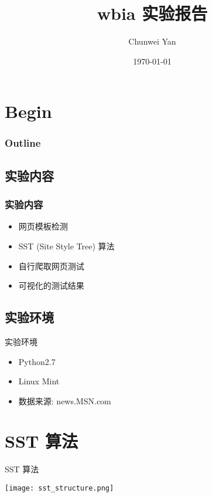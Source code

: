 \documentclass{beamer}
\title{wbia 实验报告}
\author{Chunwei Yan}
\institute[PKUSZ]{
\texttt{YanChunwei@outlook.com}
}
\date{\today}
\begin{document}
\begin{frame}
  \titlepage
\end{frame}

\section{Begin}
\begin{frame}
\frametitle{Outline}
\tableofcontents
\end{frame}
\subsection{实验内容}
\begin{frame}
\frametitle{实验内容}
    \begin {itemize} 
    \item 网页模板检测
    \item SST (Site Style Tree) 算法
    \item 自行爬取网页测试
    \item 可视化的测试结果
    \end{itemize}
\end{frame}

\subsection{实验环境}
\begin{frame}{实验环境}
    \begin{itemize}
    \item Python2.7
    \item Linux Mint
    \item 数据来源: news.MSN.com
    \end{itemize}
\end{frame}

\section{SST 算法}
\begin{frame}{SST 算法}
    \begin{center}
    \texttt{[image: sst\_structure.png]}
    \end{center}
\end{frame}
\end{document}
